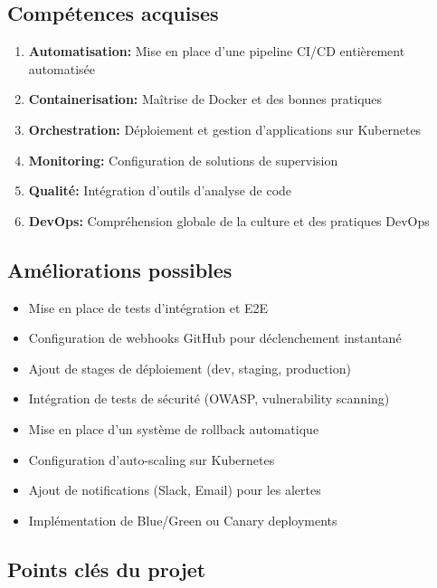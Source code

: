 \documentclass[12pt,a4paper]{article}
\begin{document}
\subsection{Compétences acquises}

\begin{enumerate}
    \item \textbf{Automatisation:} Mise en place d'une pipeline CI/CD entièrement automatisée
    \item \textbf{Containerisation:} Maîtrise de Docker et des bonnes pratiques
    \item \textbf{Orchestration:} Déploiement et gestion d'applications sur Kubernetes
    \item \textbf{Monitoring:} Configuration de solutions de supervision
    \item \textbf{Qualité:} Intégration d'outils d'analyse de code
    \item \textbf{DevOps:} Compréhension globale de la culture et des pratiques DevOps
\end{enumerate}

\subsection{Améliorations possibles}

\begin{itemize}
    \item Mise en place de tests d'intégration et E2E
    \item Configuration de webhooks GitHub pour déclenchement instantané
    \item Ajout de stages de déploiement (dev, staging, production)
    \item Intégration de tests de sécurité (OWASP, vulnerability scanning)
    \item Mise en place d'un système de rollback automatique
    \item Configuration d'auto-scaling sur Kubernetes
    \item Ajout de notifications (Slack, Email) pour les alertes
    \item Implémentation de Blue/Green ou Canary deployments
\end{itemize}

\subsection{Points clés du projet}
\end{document}
